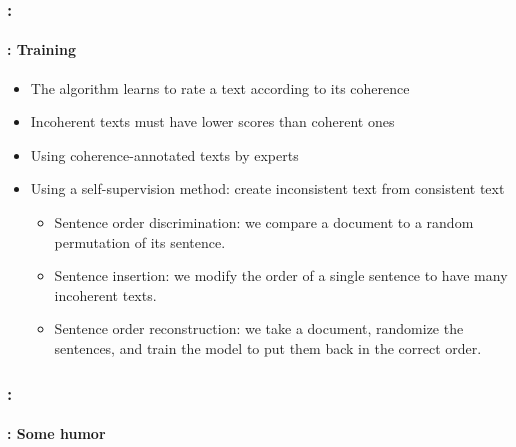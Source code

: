 \documentclass[xcolor=table]{beamer}
\begin{document}
\begin{frame}
	\frametitle{\insertshortsubtitle: \insertsection}
	\framesubtitle{\insertsubsection: Training}

	\begin{itemize}
		\item The algorithm learns to rate a text according to its coherence
		\item Incoherent texts must have lower scores than coherent ones
		\item Using coherence-annotated texts by experts
		\item Using a self-supervision method: create inconsistent text from consistent text
		\begin{itemize}
			\item Sentence order discrimination: we compare a document to a random permutation of its sentence. 
			\item Sentence insertion: we modify the order of a single sentence to have many incoherent texts.
			\item Sentence order reconstruction: we take a document, randomize the sentences, and train the model to put them back in the correct order. 
		\end{itemize}
	\end{itemize}
	
\end{frame}

\begin{frame}
	\frametitle{\insertshortsubtitle: \insertsection}
	\framesubtitle{\insertsubsection: Some humor}
	
	\begin{center}
	\end{center}
	
\end{frame}


\end{document}
